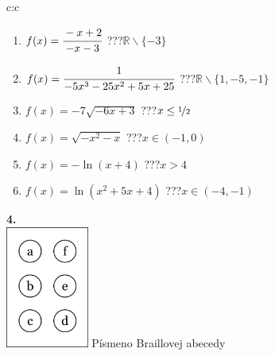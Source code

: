 \documentclass[10pt]{report}
\begin{document}
\begin{tabular}{c:c}
\begin{minipage}[c][104.5mm][t]{0.5\linewidth}
\begin{center}
\begin{minipage}{0.79\linewidth}
\begin{center}
\begin{varwidth}{\linewidth}
\begin{enumerate}
\item $f(x)=\cfrac{-x+2}{-x-3}$\quad \dotfill\; ???\;\dotfill \quad $\mathbb{R}\smallsetminus\{-3\}$
\item $f(x)=\cfrac{1}{-5x^3-25x^2+5x+25}$\quad \dotfill\; ???\;\dotfill \quad $\mathbb{R}\smallsetminus\{1,-5,-1\}$
\item $f(x)=-7\sqrt{-6x+3}$\quad \dotfill\; ???\;\dotfill \quad $x\leq\nicefrac{1}{2}$
\item $f(x)=\sqrt{-x^2-x}$\quad \dotfill\; ???\;\dotfill \quad $x\in(-1 , 0)$
\item $f(x)=-\ln{(x+4)}$\quad \dotfill\; ???\;\dotfill \quad $x>4$
\item $f(x)=\ln{(x^2+5x+4)}$\quad \dotfill\; ???\;\dotfill \quad $x\in(-4 , -1)$
\end{enumerate}
\end{varwidth}
\end{center}
\end{minipage}
\begin{minipage}{0.20\linewidth}
\begin{center}
{\Huge\bfseries 4.} \\[2mm]
\includegraphics[height=40mm]{../images/braille.png}
{\small Písmeno Braillovej abecedy}
\end{center}
\end{minipage}
\end{center}
\end{minipage}
%
\end{tabular}
\newpage
\thispagestyle{empty}
\end{document}
